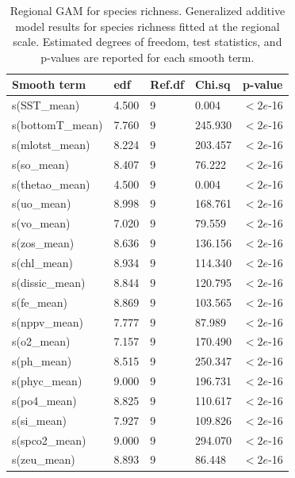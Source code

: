 \documentclass[a4paper,fleqn]{cas-sc}
\begin{document}
\begin{table}[width=.9\linewidth,cols=5,pos=h]
\caption{Regional GAM for species richness. Generalized additive model results for species richness fitted at the regional scale. Estimated degrees of freedom, test statistics, and p-values are reported for each smooth term.}
\small
\begin{tabular*}{\tblwidth}{@{} LLLLL @{}}
\toprule
\textbf{Smooth term} & \textbf{edf} & \textbf{Ref.df} & \textbf{Chi.sq} & \textbf{p-value} \\
\midrule
s(SST\_mean)      & 4.500 & 9 &   0.004 & $< 2e$-16 \\
s(bottomT\_mean) & 7.760 & 9 & 245.930 & $< 2e$-16 \\
s(mlotst\_mean)   & 8.224 & 9 & 203.457 & $< 2e$-16 \\
s(so\_mean)       & 8.407 & 9 &  76.222 & $< 2e$-16 \\
s(thetao\_mean)   & 4.500 & 9 &   0.004 & $< 2e$-16 \\
s(uo\_mean)       & 8.998 & 9 & 168.761 & $< 2e$-16 \\
s(vo\_mean)       & 7.020 & 9 &  79.559 & $< 2e$-16 \\
s(zos\_mean)      & 8.636 & 9 & 136.156 & $< 2e$-16 \\
s(chl\_mean)      & 8.934 & 9 & 114.340 & $< 2e$-16 \\
s(dissic\_mean)   & 8.844 & 9 & 120.795 & $< 2e$-16 \\
s(fe\_mean)       & 8.869 & 9 & 103.565 & $< 2e$-16 \\
s(nppv\_mean)     & 7.777 & 9 &  87.989 & $< 2e$-16 \\
s(o2\_mean)       & 7.157 & 9 & 170.490 & $< 2e$-16 \\
s(ph\_mean)       & 8.515 & 9 & 250.347 & $< 2e$-16 \\
s(phyc\_mean)     & 9.000 & 9 & 196.731 & $< 2e$-16 \\
s(po4\_mean)      & 8.825 & 9 & 110.617 & $< 2e$-16 \\
s(si\_mean)       & 7.927 & 9 & 109.826 & $< 2e$-16 \\
s(spco2\_mean)    & 9.000 & 9 & 294.070 & $< 2e$-16 \\
s(zeu\_mean)      & 8.893 & 9 &  86.448 & $< 2e$-16 \\
\bottomrule
\end{tabular*}
\label{tab:12}
\end{table}
\FloatBarrier
\end{document}
